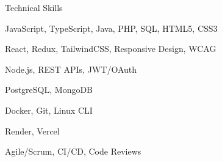 \documentclass[letterpaper, 10pt]{article}
\begin{document}
\begin{rSection}{Technical Skills}
\begin{multicols}{2}
\begin{description}[leftmargin=0cm]
\item[Languages:]
JavaScript, TypeScript, Java, PHP, SQL, HTML5, CSS3
\item[Frontend:]
React, Redux, TailwindCSS, Responsive Design, WCAG
\item[Backend:]
Node.js, REST APIs, JWT/OAuth
\item[Databases:]
PostgreSQL, MongoDB
\item[Tools:]
Docker, Git, Linux CLI
\item[Cloud:]
Render, Vercel
\item[Practices:]
Agile/Scrum, CI/CD, Code Reviews
\end{description}
\end{multicols}
\end{rSection}
\end{document}
